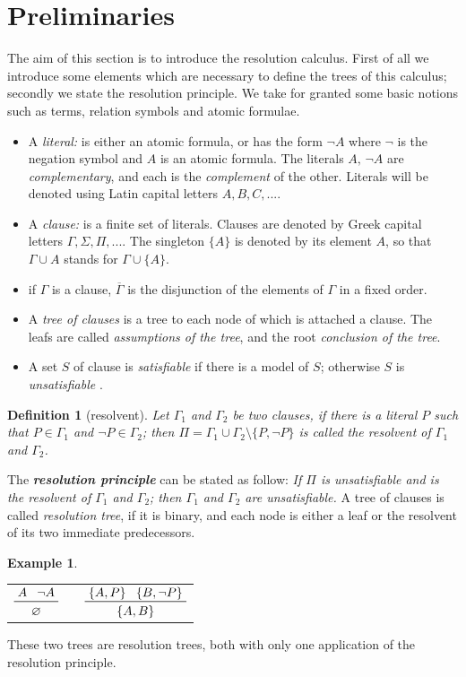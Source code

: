 \documentclass[a4paper,12pt,oneside]{book}
\newtheorem{definition}[theorem]{Definition}
\newtheorem{example}[theorem]{Example}
\let\emptyset\varnothing
\begin{document}
\section{Preliminaries}
The aim of this section is to introduce the resolution calculus. First of all we introduce some elements which are necessary to define the trees of this calculus; secondly we state the resolution principle. We take for granted some basic notions such as terms, relation symbols and atomic formulae. 
\begin{itemize}
\item A \textit{literal:} is either an atomic formula, or has the form $\neg A$ where $\neg$ is the negation symbol and $A$ is an atomic formula. The literals $A,\,\neg A$ are \textit{complementary}, and each is the \textit{complement} of the other. Literals will be denoted using Latin capital  letters $A,B,C,...$.
\item A \textit{clause:} is a finite set of literals. Clauses are denoted by Greek capital letters $\Gamma,\Sigma ,\Pi,...$. The singleton $\{A\}$ is denoted by its element $A$, so that $\Gamma\cup A$ stands for $\Gamma\cup\{A\}$.
\item if $\Gamma$ is a clause, $\overline{\Gamma}$ is the disjunction of the elements of $\Gamma$ in a fixed order.
\item A \textit{tree of clauses} is a tree to each node of which is attached a clause. The leafs are called \textit{assumptions of the tree}, and the root \textit{conclusion of the tree}.
\item A set $S$ of clause is \textit{satisfiable} if there is a model of $S$; otherwise $S$ is \textit{unsatisfiable} \cite{robinson}.
\end{itemize}

\begin{definition}[resolvent]
Let $\Gamma_1$ and $\Gamma_2$ be two clauses, if there is a literal $P$ such that $P\in\Gamma_1$ and $\neg P\in\Gamma_2$; then $\Pi =\Gamma_1\cup\Gamma_2\setminus\{P,\neg P\}$ is called the resolvent of $\Gamma_1$ and $\Gamma_2$.
\end{definition}
The \textit{\textbf{resolution principle}} can be stated as follow:
\textit{If $\Pi$ is unsatisfiable and is the resolvent of  $\Gamma_1$ and $\Gamma_2$; then  $\Gamma_1$ and $\Gamma_2$ are unsatisfiable.}
A tree of clauses is called \textit{resolution tree}, if it is binary, and each node is either a leaf or the resolvent of its two immediate predecessors.

\newpage\noindent\begin{example}\label{example}
\end{example}
\begin{center}
\begin{tabular}{ccc}
$\prftree{A}{\neg A}{\emptyset}$& \hspace{4cm}&
$\prftree{\{A,P \}}{\{B, \neg P \}}{\{A,B \}}$
\end{tabular}
\end{center}
These two trees are resolution trees, both with only one application of the resolution principle. 
\end{document}
